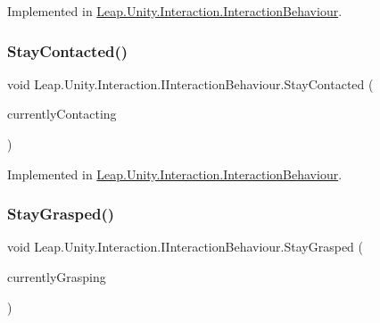 Implemented in \mbox{\hyperlink{class_leap_1_1_unity_1_1_interaction_1_1_interaction_behaviour_a0f5248395ddcbab62086bd9d2f620d80}{Leap.\+Unity.\+Interaction.\+Interaction\+Behaviour}}.

\mbox{\label{interface_leap_1_1_unity_1_1_interaction_1_1_i_interaction_behaviour_a5a1fd5a7196c9252624de033c80b25f8}} 
\subsubsection{\texorpdfstring{StayContacted()}{StayContacted()}}
{\footnotesize\ttfamily void Leap.\+Unity.\+Interaction.\+I\+Interaction\+Behaviour.\+Stay\+Contacted (\begin{DoxyParamCaption}\item[{List$<$ \mbox{\hyperlink{class_leap_1_1_unity_1_1_interaction_1_1_interaction_controller}{Interaction\+Controller}} $>$}]{currently\+Contacting }\end{DoxyParamCaption})}



Implemented in \mbox{\hyperlink{class_leap_1_1_unity_1_1_interaction_1_1_interaction_behaviour_a436494ab292bc5f759194d5ea68e077c}{Leap.\+Unity.\+Interaction.\+Interaction\+Behaviour}}.

\mbox{\label{interface_leap_1_1_unity_1_1_interaction_1_1_i_interaction_behaviour_a8c95d4e968d94cec18ac2038e914931e}} 
\subsubsection{\texorpdfstring{StayGrasped()}{StayGrasped()}}
{\footnotesize\ttfamily void Leap.\+Unity.\+Interaction.\+I\+Interaction\+Behaviour.\+Stay\+Grasped (\begin{DoxyParamCaption}\item[{List$<$ \mbox{\hyperlink{class_leap_1_1_unity_1_1_interaction_1_1_interaction_controller}{Interaction\+Controller}} $>$}]{currently\+Grasping }\end{DoxyParamCaption})}



